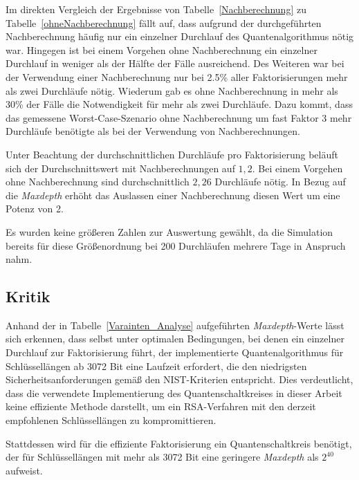 Im direkten Vergleich der Ergebnisse von Tabelle~\ref{Nachberechnung} zu Tabelle~\ref{ohneNachberechnung} fällt auf, 
dass aufgrund der durchgeführten Nachberechnung häufig nur ein einzelner Durchlauf des Quantenalgorithmus nötig war. 
Hingegen ist bei einem Vorgehen ohne Nachberechnung ein einzelner Durchlauf in weniger als der Hälfte der Fälle ausreichend. 
Des Weiteren war bei der Verwendung einer Nachberechnung nur bei 2.5\% aller Faktorisierungen mehr als zwei Durchläufe nötig. 
Wiederum gab es ohne Nachberechnung in mehr als 30\% der Fälle die Notwendigkeit für mehr als zwei Durchläufe. 
Dazu kommt, 
dass das gemessene Worst-Case-Szenario ohne Nachberechnung um fast Faktor 3 mehr Durchläufe benötigte als bei der Verwendung von Nachberechnungen.

Unter Beachtung der durchschnittlichen Durchläufe pro Faktorisierung beläuft sich der Durchschnittswert mit Nachberechnungen auf \(1,2\). 
Bei einem Vorgehen ohne Nachberechnung sind durchschnittlich \(2,26\) Durchläufe nötig. 
In Bezug auf die \textit{Maxdepth} erhöht das Auslassen einer Nachberechnung diesen Wert um eine Potenz von 2.

Es wurden keine größeren Zahlen zur Auswertung gewählt, 
da die Simulation bereits für diese Größenordnung bei 200 Durchläufen mehrere Tage in Anspruch nahm.

\subsection*{Kritik}

Anhand der in Tabelle~\ref{Varainten_Analyse} aufgeführten \textit{Maxdepth}-Werte lässt sich erkennen, 
dass selbst unter optimalen Bedingungen, bei denen ein einzelner Durchlauf zur Faktorisierung führt, 
der implementierte Quantenalgorithmus für Schlüssellängen ab 3072 Bit eine Laufzeit erfordert, 
die den niedrigsten Sicherheitsanforderungen gemäß den NIST-Kriterien entspricht. 
Dies verdeutlicht, dass die verwendete Implementierung des Quantenschaltkreises in dieser Arbeit keine effiziente Methode darstellt, 
um ein RSA-Verfahren mit den derzeit empfohlenen Schlüssellängen zu kompromittieren.

Stattdessen wird für die effiziente Faktorisierung ein Quantenschaltkreis benötigt, 
der für Schlüssellängen mit mehr als 3072 Bit eine geringere \textit{Maxdepth} als \(2^{40}\) aufweist.

\vspace{1em}

